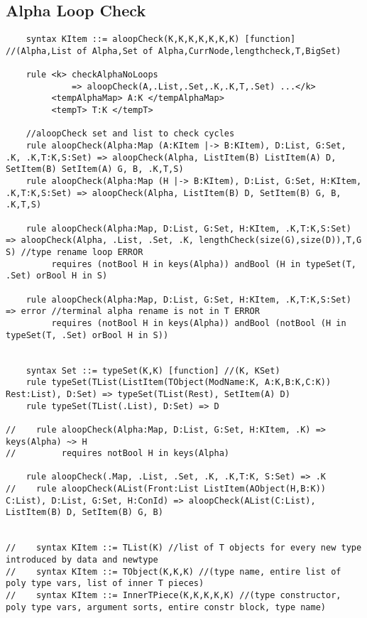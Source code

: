 \subsection{Alpha Loop Check}
\begin{lstlisting}
    syntax KItem ::= aloopCheck(K,K,K,K,K,K,K) [function] //(Alpha,List of Alpha,Set of Alpha,CurrNode,lengthcheck,T,BigSet)

    rule <k> checkAlphaNoLoops
             => aloopCheck(A,.List,.Set,.K,.K,T,.Set) ...</k>
         <tempAlphaMap> A:K </tempAlphaMap>
         <tempT> T:K </tempT>

    //aloopCheck set and list to check cycles
    rule aloopCheck(Alpha:Map (A:KItem |-> B:KItem), D:List, G:Set, .K, .K,T:K,S:Set) => aloopCheck(Alpha, ListItem(B) ListItem(A) D, SetItem(B) SetItem(A) G, B, .K,T,S)
    rule aloopCheck(Alpha:Map (H |-> B:KItem), D:List, G:Set, H:KItem, .K,T:K,S:Set) => aloopCheck(Alpha, ListItem(B) D, SetItem(B) G, B, .K,T,S)

    rule aloopCheck(Alpha:Map, D:List, G:Set, H:KItem, .K,T:K,S:Set) => aloopCheck(Alpha, .List, .Set, .K, lengthCheck(size(G),size(D)),T,G S) //type rename loop ERROR
         requires (notBool H in keys(Alpha)) andBool (H in typeSet(T, .Set) orBool H in S) 

    rule aloopCheck(Alpha:Map, D:List, G:Set, H:KItem, .K,T:K,S:Set) => error //terminal alpha rename is not in T ERROR
         requires (notBool H in keys(Alpha)) andBool (notBool (H in typeSet(T, .Set) orBool H in S))


    syntax Set ::= typeSet(K,K) [function] //(K, KSet)
    rule typeSet(TList(ListItem(TObject(ModName:K, A:K,B:K,C:K)) Rest:List), D:Set) => typeSet(TList(Rest), SetItem(A) D)
    rule typeSet(TList(.List), D:Set) => D

//    rule aloopCheck(Alpha:Map, D:List, G:Set, H:KItem, .K) => keys(Alpha) ~> H
//         requires notBool H in keys(Alpha)

    rule aloopCheck(.Map, .List, .Set, .K, .K,T:K, S:Set) => .K
//    rule aloopCheck(AList(Front:List ListItem(AObject(H,B:K)) C:List), D:List, G:Set, H:ConId) => aloopCheck(AList(C:List), ListItem(B) D, SetItem(B) G, B)


//    syntax KItem ::= TList(K) //list of T objects for every new type introduced by data and newtype
//    syntax KItem ::= TObject(K,K,K) //(type name, entire list of poly type vars, list of inner T pieces)
//    syntax KItem ::= InnerTPiece(K,K,K,K,K) //(type constructor, poly type vars, argument sorts, entire constr block, type name)
\end{lstlisting}

